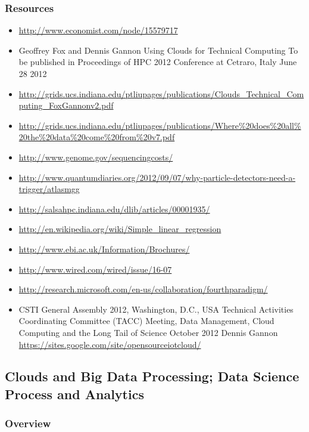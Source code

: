 

\subsubsection{Resources}\label{resources-1}

\begin{itemize}
\tightlist
\item
  \url{http://www.economist.com/node/15579717}
\item
  Geoffrey Fox and Dennis Gannon Using Clouds for Technical Computing To
  be published in Proceedings of HPC 2012 Conference at Cetraro, Italy
  June 28 2012
\item
  \url{http://grids.ucs.indiana.edu/ptliupages/publications/Clouds_Technical_Computing_FoxGannonv2.pdf}
\item
  \url{http://grids.ucs.indiana.edu/ptliupages/publications/Where\%20does\%20all\%20the\%20data\%20come\%20from\%20v7.pdf}
\item
  \url{http://www.genome.gov/sequencingcosts/}
\item
  \url{http://www.quantumdiaries.org/2012/09/07/why-particle-detectors-need-a-trigger/atlasmgg}
\item
  \url{http://salsahpc.indiana.edu/dlib/articles/00001935/}
\item
  \url{http://en.wikipedia.org/wiki/Simple_linear_regression}
\item
  \url{http://www.ebi.ac.uk/Information/Brochures/}
\item
  \url{http://www.wired.com/wired/issue/16-07}
\item
  \url{http://research.microsoft.com/en-us/collaboration/fourthparadigm/}
\item
  CSTI General Assembly 2012, Washington, D.C., USA Technical Activities
  Coordinating Committee (TACC) Meeting, Data Management, Cloud
  Computing and the Long Tail of Science October 2012 Dennis Gannon
  \url{https://sites.google.com/site/opensourceiotcloud/}
\end{itemize}

\subsection{Clouds and Big Data Processing; Data Science Process and
Analytics}\label{clouds-and-big-data-processing-data-science-process-and-analytics}

\subsubsection{Overview}\label{overview-1}

